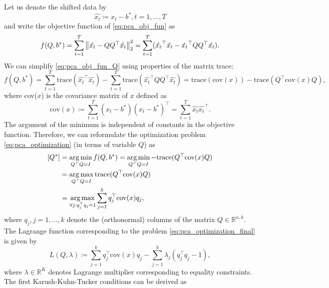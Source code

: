 Let us denote the shifted data by
\begin{equation}
    \hat{x_t} \coloneqq x_t - b^* , t=1, \dots, T
\end{equation}
and write the objective function of \eqref{eq:pca_obj_fun} as
\begin{equation}
    f(Q,b^*) = \sum_{t=1}^T \left\lVert\hat{x_t} - QQ^{\top}\hat{x_t}\right\rVert_2^2 = \sum_{t=1}^T (\hat{x_t}^{\top}\hat{x_t} - \hat{x_t}^{\top} QQ^{\top} \hat{x_t}).
    \label{eq:pca_obj_fun_Q}
\end{equation}
We can simplify \eqref{eq:pca_obj_fun_Q} using properties of the matrix trace:
\begin{equation}
    f(Q,b^*) = \sum_{t=1}^T \text{trace} (\hat{x_t}^{\top}\hat{x_t}) - \sum_{t=1}^T \text{trace} (\hat{x_t}^{\top} QQ^{\top} \hat{x_t})
    = \text{trace}(\text{cov}(x)) - \text{trace}(Q^{\top} \text{cov}(x) Q ),
\end{equation}
where cov($x$) is the covariance matrix of $x$ defined as
\begin{equation}
    \text{cov}(x) \coloneqq \sum_{t=1}^T(x_t-b^*)(x_t-b^*)^{\top} = \sum_{t=1}^T\hat{x_t}\hat{x_t}^{\top}.
\end{equation}
The argument of the minimum is independent of constants in the objective function. Therefore, we can reformulate the optimization problem \eqref{eq:pca_optimization} (in terms of variable $Q$) as
\begin{equation}
    \begin{split}
        [Q^*] &= \operatorname*{arg\,min}_{Q^{\top}Q=I} f(Q,b^*) = \operatorname*{arg\,min}_{Q^{\top}Q=I} -\text{trace}(Q^{\top}\text{cov}(x)Q) \\&= \operatorname*{arg\,max}_{Q^{\top}Q=I} \text{trace}(Q^{\top}\text{cov}(x)Q) \\&= \operatorname*{arg\,max}_{\forall j:q_j^{\top}q_j=1} \sum_{j=1}^k q_j^{\top} \text{cov}(x) q_j,
    \end{split}
    \label{eq:pca_optimization_final}
\end{equation}
where $q_j , j=1,\dots,k$ denote the (orthonormal) columns of the matrix $Q \in \mathbb{R}^{n,k}$. The Lagrange function corresponding to the problem \eqref{eq:pca_optimization_final} is given by
\begin{equation}
    L(Q, \lambda) \coloneqq \sum_{j=1}^k q_j^{\top} \text{cov}(x)q_j - \sum_{j=1}^k \lambda_j (q_j^{\top} q_j - 1),
\end{equation}
where $\lambda \in \mathbb{R}^K$ denotes Lagrange multiplier corresponding to equality constraints. The first Karush-Kuhn-Tucker conditions can be derived as
